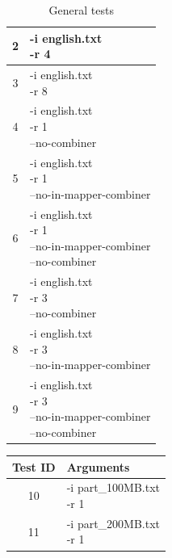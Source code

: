 \documentclass{article}
\begin{document}
\begin{multicols}{2}
\begin{table}[H]
\begin{tabular}{|c|l|}
            \hline
            2 & \makecell[l]{-i english.txt \\ -r 4} \\        
            \hline
            3 & \makecell[l]{-i english.txt \\ -r 8} \\        
            \hline
            4 & \makecell[l]{-i english.txt \\ -r 1 \\ --no-combiner} \\        
            \hline
            5 & \makecell[l]{-i english.txt \\ -r 1 \\ --no-in-mapper-combiner} \\        
            \hline
            6 & \makecell[l]{-i english.txt \\ -r 1 \\ --no-in-mapper-combiner \\ --no-combiner} \\        
            \hline
            7 & \makecell[l]{-i english.txt \\ -r 3 \\ --no-combiner} \\        
            \hline
            8 & \makecell[l]{-i english.txt \\ -r 3 \\ --no-in-mapper-combiner} \\        
            \hline
            9 & \makecell[l]{-i english.txt \\ -r 3 \\ --no-in-mapper-combiner \\ --no-combiner} \\        
            \hline
        \end{tabular}
        \caption{General tests}
        \label{tab:general_tests}
    \end{table}
    \begin{table}[H]
        \centering
        \begin{tabular}{|c|l|}
            \hline
            Test ID & Arguments \\
            \hline
            10 & \makecell[l]{-i part\_100MB.txt \\ -r 1} \\  
            \hline      
            11 & \makecell[l]{-i part\_200MB.txt \\ -r 1} \\  
            \hline      

\end{tabular}
\end{table}
\end{multicols}
\end{document}
